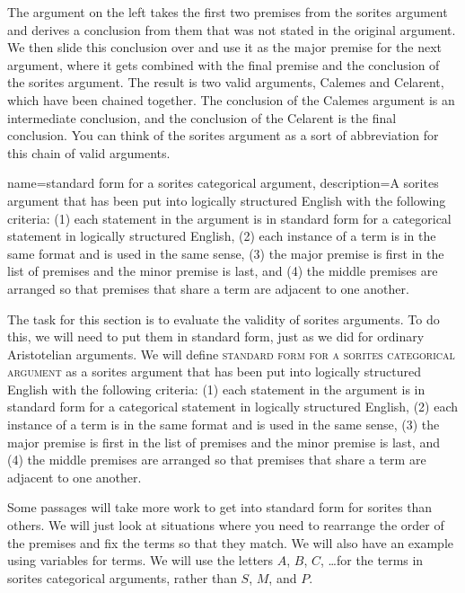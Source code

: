 {\begin{tikzpicture}
\end{tikzpicture}




The argument on the left takes the first two premises from the sorites argument and derives a conclusion from them that was not stated in the original argument. We then slide this conclusion over and use it as the major premise for the next argument, where it gets combined with the final premise and the conclusion of the sorites argument. The result is two valid arguments, Calemes and Celarent, which have been chained together. The conclusion of the Calemes argument is an intermediate conclusion, and the conclusion of the Celarent is the final conclusion. You can think of the sorites argument as a sort of abbreviation for this chain of valid arguments. 

{
name=standard form for a sorites categorical argument,
description={A sorites argument that has been put into logically structured English with the following criteria: (1) each statement in the argument is in standard form for a categorical statement in logically structured English, (2) each instance of a term is in the same format and is used in the same sense, (3) the major premise is first in the list of premises and the minor premise is last, and (4) the middle premises are arranged so that premises that share a term are adjacent to one another.}
}

The task for this section is to evaluate the validity of sorites arguments. To do this, we will need to put them in standard form, just as we did for ordinary Aristotelian arguments. We will define \textsc{\gls{standard form for a sorites categorical argument}} \label{def:standard_form_for_a_sorites_categorical_argument} as a sorites argument that has been put into logically structured English with the following criteria: (1) each statement in the argument is in standard form for a categorical statement in logically structured English, (2) each instance of a term is in the same format and is used in the same sense, (3) the major premise is first in the list of premises and the minor premise is last, and (4) the middle premises are arranged so that premises that share a term are adjacent to one another.

Some passages will take more work to get into standard form for sorites than others. We will just look at situations where you need to rearrange the order of the premises and fix the terms so that they match. We will also have an example using variables for terms. We will use the letters $A$, $B$, $C$, \ldots for the terms in sorites categorical arguments, rather than $S$, $M$, and $P$. 

}
